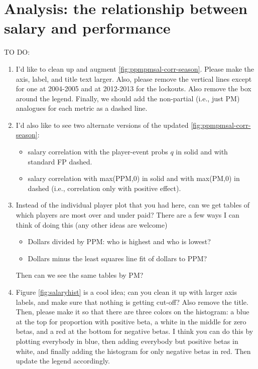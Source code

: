 \section{Analysis: the relationship between salary and performance}
\label{sec:salary}

{\color{red}  TO DO: 
\begin{enumerate}
    \item I'd like to clean up and augment \ref{fig:ppmpmsal-corr-season}.  Please make the axis, label, and title text larger.  Also, please remove the vertical lines except for one at 2004-2005 and at 2012-2013 for the lockouts.  Also remove the box around the legend. Finally, we should add the non-partial (i.e., just PM) analogues for each metric as a dashed line.
    \item I'd also like to see two alternate versions of the updated \ref{fig:ppmpmsal-corr-season}: 
    \begin{itemize}
    \item salary correlation with the player-event probs $q$ in solid and with standard FP dashed.
    \item salary correlation with max(PPM,0) in solid and with max(PM,0) in dashed (i.e., correlation only with positive effect).
    \end{itemize}
    \item Instead of the individual player plot that you had here, can we get tables of which players are most over and under paid? There are a few ways I can think of doing this (any other ideas are welcome)
    \begin{itemize}
    \item Dollars divided by PPM: who is highest and who is lowest?
    \item Dollars minus the least squares line fit of dollars to PPM?
    \end{itemize}
    Then can we see the same tables by PM?
    \item Figure \ref{fig:salaryhist} is a cool idea; can you clean it up with larger axis labels, and make sure that nothing is getting cut-off?  Also remove the title.  Then, please make it so that there are three colors on the histogram: a blue at the top for proportion with positive beta, a white in the middle for zero betas, and a red at the bottom for negative betas.  I think you can do this by plotting everybody in blue, then adding everybody but positive betas in white, and finally adding the histogram for only negative betas in red.  Then update the legend accordingly.
\end{enumerate}}

